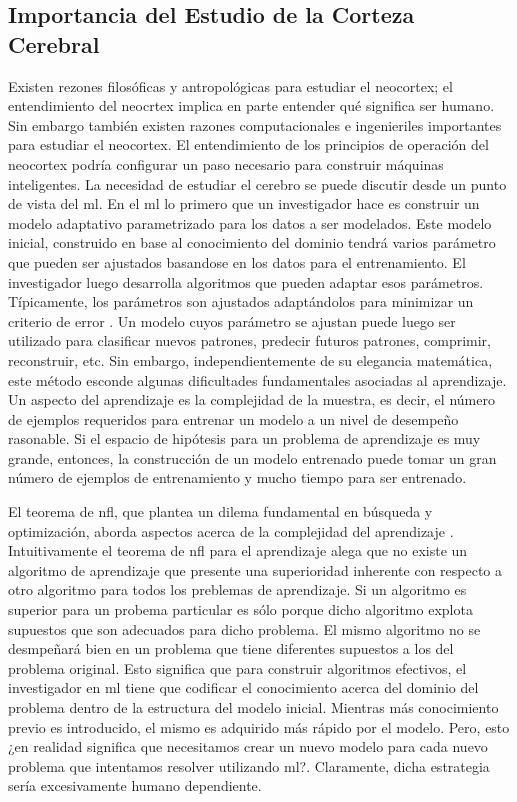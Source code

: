 \subsection{Importancia del Estudio de la Corteza Cerebral}

Existen rezones filosóficas y antropológicas para estudiar el neocortex; el entendimiento del neocrtex implica en parte
entender qué significa ser humano.
Sin embargo también existen razones computacionales e ingenieriles importantes para estudiar el neocortex.
El entendimiento de los principios de operación del neocortex podría configurar un paso necesario para construir máquinas inteligentes.
La necesidad de estudiar el cerebro se puede discutir desde un punto de vista del \gls{ml}.
En el \gls{ml} lo primero que un investigador hace es construir un modelo adaptativo parametrizado para los datos a ser modelados.
Este modelo inicial, construido en base al conocimiento del dominio tendrá varios parámetro que pueden ser ajustados basandose en los datos para el entrenamiento.
El investigador luego desarrolla algoritmos que pueden adaptar esos parámetros.
Típicamente, los parámetros son ajustados adaptándolos para minimizar un criterio de error \cite{bishop2007,dudaHart1973}.
Un modelo cuyos parámetro se ajustan puede luego ser utilizado para clasificar nuevos patrones,
predecir futuros patrones, comprimir, reconstruir, etc.
Sin embargo, independientemente de su elegancia matemática, este método esconde algunas dificultades fundamentales asociadas al aprendizaje.
Un aspecto del aprendizaje es la complejidad de la muestra, es decir, el número de ejemplos requeridos para entrenar un modelo
a un nivel de desempeño rasonable.
Si el espacio de hipótesis para un problema de aprendizaje es muy grande,
entonces, la construcción de un modelo entrenado puede tomar un gran número de ejemplos de entrenamiento
y mucho tiempo para ser entrenado.

El teorema de \gls{nfl}, que plantea un dilema fundamental en búsqueda y optimización,
aborda aspectos acerca de la complejidad del aprendizaje \cite{RePEc:eee:renene:v:134:y:2019:i:c:p:1295-1306}.
Intuitivamente el teorema de \gls{nfl} para el aprendizaje alega que 
no existe un algoritmo de aprendizaje que presente una superioridad inherente con respecto a otro algoritmo
para todos los preblemas de aprendizaje.
Si un algoritmo es superior para un probema particular es sólo porque dicho algoritmo explota
supuestos que son adecuados para dicho problema.
El mismo algoritmo no se desmpeñará bien en un problema que tiene diferentes supuestos
a los del problema original.
Esto significa que para construir algoritmos efectivos, el investigador en \gls{ml}
tiene que codificar el conocimiento acerca del dominio del problema dentro de la estructura del modelo inicial.
Mientras más conocimiento previo es introducido, el mismo es adquirido más rápido por el modelo.
Pero, esto ¿en realidad significa que necesitamos crear un nuevo modelo para cada nuevo problema
que intentamos resolver utilizando \gls{ml}?.
Claramente, dicha estrategia sería excesivamente humano dependiente.

